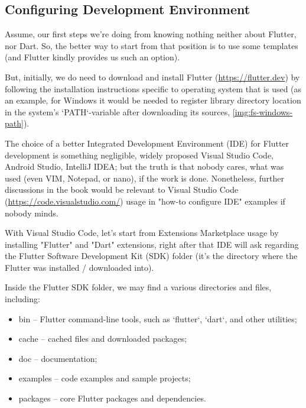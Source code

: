 
\subsection{Configuring Development Environment}

Assume, our first steps we're doing from knowing nothing neither about Flutter, nor Dart. So, the better way to start 
from that position is to use some templates (and Flutter kindly provides us such an option).

But, initially, we do need to download and install Flutter (\href{https://flutter.dev}{https://flutter.dev}) by 
following the installation instructions specific to operating system that is used (as an example, for Windows it 
would be needed to register library directory location in the system's `PATH`-variable after downloading its sources, 
\cref{img:fs-windows-path}).


The choice of a better Integrated Development Environment (IDE) for Flutter development is something negligible, widely
proposed Visual Studio Code, Android Studio, IntelliJ IDEA; but the truth is that nobody cares, what was used (even VIM,
Notepad, or nano), if the work is done. Nonetheless, further discussions in the book would be relevant to Visual 
Studio Code (\href{https://code.visualstudio.com/}{https://code.visualstudio.com/}) usage in "how-to configure IDE" 
examples if nobody minds.

With Visual Studio Code, let's start from Extensions Marketplace usage by installing "Flutter" and "Dart" extensions, 
right after that IDE will ask regarding the Flutter Software Development Kit (SDK) folder (it's the directory where 
the Flutter was installed / downloaded into).

Inside the Flutter SDK folder, we may find a various directories and files, including:

\begin{itemize}
  \item bin -- Flutter command-line tools, such as `flutter`, `dart`, and other utilities;
  \item cache -- cached files and downloaded packages;
  \item doc -- documentation;
  \item examples -- code examples and sample projects;
  \item packages -- core Flutter packages and dependencies.
\end{itemize}


